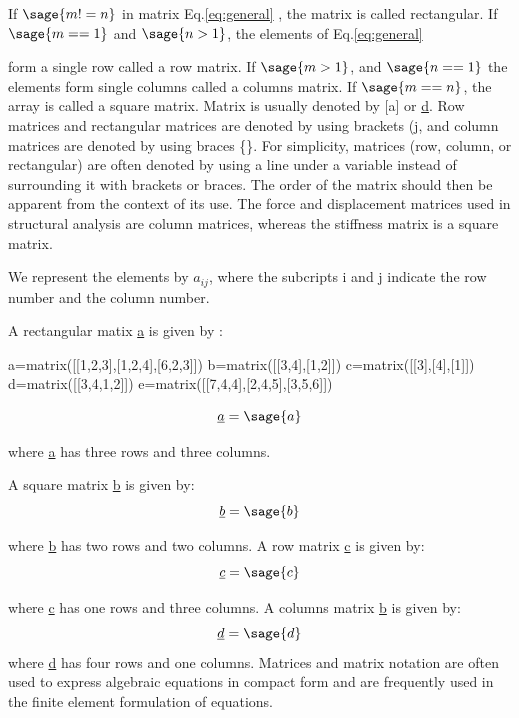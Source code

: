\documentclass[12pt]{report}
\newcommand{\lab}[1]{
	Eq.\ref{#1}
}
\begin{document}
If $\sage{m!=n}$ in matrix \lab{eq:general},
the matrix is called rectangular. If $\sage{m==1}$ 
and $\sage{n>1}$, the elements of \lab{eq:general}
form a single row called a row matrix. If $\sage{m>1}$,
and $\sage{n==1}$ the elements form single columns called
a columns matrix. If $\sage{m==n}$, the array is called
a square matrix. Matrix is usually denoted by
[a] or \underline{d}. Row matrices and rectangular 
matrices are denoted by using brackets (j, and 
column matrices are denoted by using 
braces \{\}. For simplicity, matrices (row, column,
or rectangular) are often denoted by using a line 
under a variable instead of surrounding it with 
brackets or braces. The order of the matrix should 
then be apparent from the context of its 
use. The force and displacement matrices used in 
structural analysis are column matrices, whereas 
the stiffness matrix is a square matrix.

We represent the elements by $a_{{ij}}$,
where the subcripts i and j indicate the
row number and the column number.

A rectangular matix \underline{a} is given by : 
\begin{sagesilent}
	a=matrix([[1,2,3],[1,2,4],[6,2,3]])
	b=matrix([[3,4],[1,2]])
	c=matrix([[3],[4],[1]])
	d=matrix([[3,4,1,2]])
	e=matrix([[7,4,4],[2,4,5],[3,5,6]])
\end{sagesilent}
\begin{equation}
	\underline{a}=\sage{a}
\label{eq:rectangle}
\end{equation}

where \underline{a} has three rows and three columns.

A square matrix \underline{b} is given by:
\begin{equation}
	\underline{b}=\sage{b}
\label{eq:square}
\end{equation}

where \underline{b} has two rows and two
columns. A row matrix \underline{c} is given by:
\begin{equation}
	\underline{c}=\sage{c}
\label{eq:row}
\end{equation}

where \underline{c} has one rows and three
columns. A columns matrix \underline{b} is given by:
\begin{equation}
	\underline{d}=\sage{d}
\label{eq:col}
\end{equation}
where \underline{d} has four rows and one 
columns. Matrices and matrix notation are
often used to express algebraic equations 
in compact form and are frequently used 
in the finite element formulation of equations.
\end{document}

